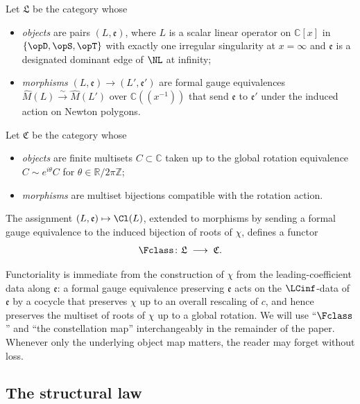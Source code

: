 \begin{definition}\label{def:F-functor}
Let $\mathfrak{L}$ be the category whose
\begin{itemize}[leftmargin=2em]
\item \emph{objects} are pairs $(L, \mathfrak{e})$, where $L$ is a
scalar linear operator on $\mathbb{C}[x]$ in $\{\opD, \opS, \opT\}$
with exactly one irregular singularity at $x = \infty$ and
$\mathfrak{e}$ is a designated dominant edge of $\NL$ at infinity;
\item \emph{morphisms} $(L, \mathfrak{e}) \to (L', \mathfrak{e}')$
are formal gauge equivalences $\widehat{M}(L) \xrightarrow{\sim}
\widehat{M}(L')$ over $\mathbb{C}((x^{-1}))$ that send
$\mathfrak{e}$ to $\mathfrak{e}'$ under the induced action on Newton
polygons.
\end{itemize}
Let $\mathfrak{C}$ be the category whose
\begin{itemize}[leftmargin=2em]
\item \emph{objects} are finite multisets $C \subset \mathbb{C}$
taken up to the global rotation equivalence
$C \sim e^{i\theta} C$ for $\theta \in \mathbb{R}/2\pi\mathbb{Z}$;
\item \emph{morphisms} are multiset bijections compatible with the
rotation action.
\end{itemize}
The assignment $(L, \mathfrak{e}) \mapsto \Cl(L)$, extended to morphisms
by sending a formal gauge equivalence to the induced bijection of
roots of $\chi$, defines a functor
\[
   \Fclass \colon \mathfrak{L} \;\longrightarrow\; \mathfrak{C}.
\]
\end{definition}

\begin{remark}\label{rem:F-functoriality}
Functoriality is immediate from the construction of $\chi$ from the
leading-coefficient data along $\mathfrak{e}$: a formal gauge
equivalence preserving $\mathfrak{e}$ acts on the $\LCinf$-data of
$\mathfrak{e}$ by a cocycle that preserves $\chi$ up to an overall
rescaling of $c$, and hence preserves the multiset of roots of $\chi$
up to a global rotation. We will use ``$\Fclass$'' and ``the
constellation map'' interchangeably in the remainder of the paper.
Whenever only the underlying object map matters, the reader may
forget  without loss.
\end{remark}

\subsection{The structural law}\label{ssec:intro-law}

